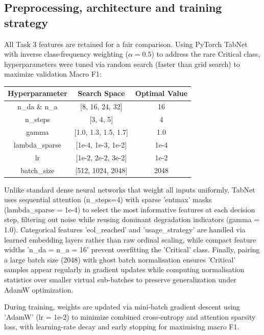 \documentclass[12pt]{article}
\begin{document}
\subsection{Preprocessing, architecture and training strategy}

All Task 3 features are retained for a fair comparison. Using PyTorch TabNet with inverse class-frequency weighting ($\alpha = 0.5$) to address the rare Critical class, hyperparameters were tuned via random search (faster than grid search) to maximize validation Macro F1:

\begin{center}
\begin{tabular}{||c c c||} 
 \hline
 Hyperparameter & Search Space & Optimal Value \\ [0.5ex] 
 \hline\hline
 n\_da \& n\_a & [8, 16, 24, 32] & 16 \\ 
 \hline
 n\_steps & [3, 4, 5] & 4 \\ 
 \hline
 gamma & [1.0, 1.3, 1.5, 1.7] & 1.0 \\ 
 \hline
 lambda\_sparse & [1e-4, 1e-3, 1e-2] & 1e-4 \\ 
 \hline
 lr & [1e-2, 2e-2, 3e-2] & 1e-2 \\ 
 \hline
 batch\_size & [512, 1024, 2048] & 2048 \\ 
 \hline
\end{tabular}
\end{center}

Unlike standard dense neural networks that weight all inputs uniformly, TabNet uses sequential attention (n_steps=4) with sparse 'entmax' masks (lambda_sparse = 1e-4) to select the most informative features at each decision step, filtering out noise while reusing dominant degradation indicators (gamma = 1.0). Categorical features 'eol_reached' and 'usage_strategy' are handled via learned embedding layers rather than raw ordinal scaling, while compact feature widths 'n_da = n_a = 16' prevent overfitting the 'Critical' class. Finally, pairing a large batch size (2048) with ghost batch normalisation ensures 'Critical' samples appear regularly in gradient updates while computing normalisation statistics over smaller virtual sub-batches to preserve generalization under AdamW optimization.

During training, weights are updated via mini-batch gradient descent using 'AdamW' (lr = 1e-2) to minimize combined cross-entropy and attention sparsity loss, with learning-rate decay and early stopping for maximising macro F1.
\end{document}
